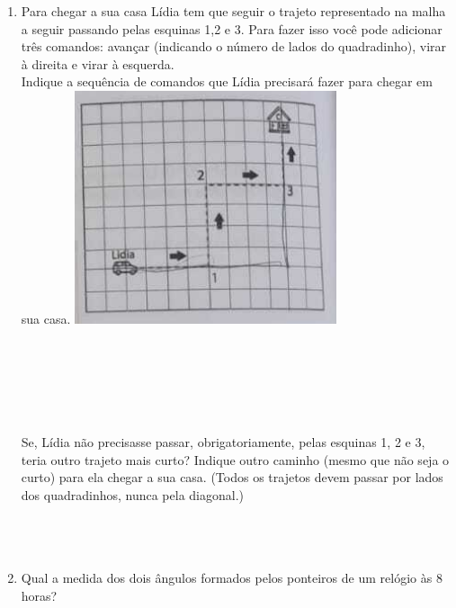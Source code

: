 \documentclass[a4paper,14pt]{article}
\begin{document}
\begin{multicols}{2}
\begin{enumerate}
        	\item Para chegar a sua casa Lídia tem que seguir o trajeto representado na malha a seguir passando pelas esquinas 1,2 e 3. Para fazer isso você pode adicionar três comandos: avançar (indicando o número de lados do quadradinho), virar à direita e virar à esquerda. \\
        	Indique a sequência de comandos que Lídia precisará fazer para chegar em sua casa.
        	\includegraphics[width=1\linewidth]{1MMA01_imagens/imagem05}\\\\\\\\\\\\\\
        	Se, Lídia não precisasse passar, obrigatoriamente, pelas esquinas 1, 2 e 3, teria outro trajeto mais curto? Indique outro caminho (mesmo que não seja o curto) para ela chegar a sua casa. (Todos os trajetos devem passar por lados dos quadradinhos, nunca pela diagonal.)\\\\\\\\
        	\item Qual a medida dos dois ângulos formados pelos ponteiros de um relógio às 8 horas?\\

\end{enumerate}
\end{multicols}
\end{document}
